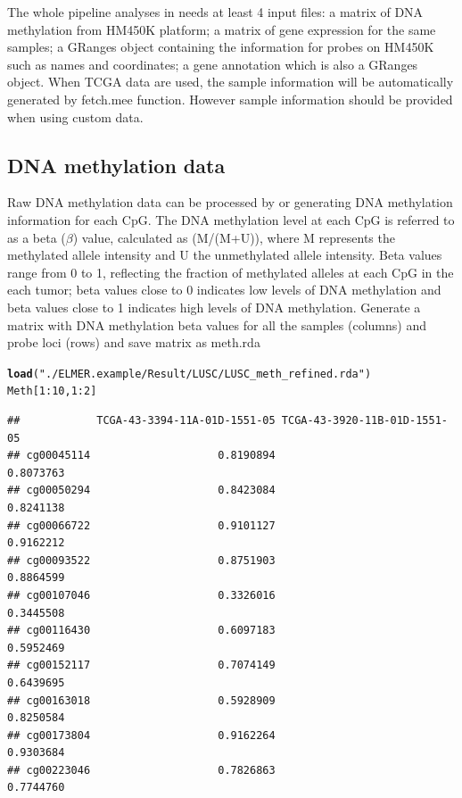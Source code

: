 \documentclass{article}\usepackage[]{graphicx}\usepackage[usenames,dvipsnames]{color}
\makeatletter
\newcommand{\hlnum}[1]{\textcolor[rgb]{0.686,0.059,0.569}{#1}}%
\newcommand{\hlstr}[1]{\textcolor[rgb]{0.192,0.494,0.8}{#1}}%
\newcommand{\hlopt}[1]{\textcolor[rgb]{0,0,0}{#1}}%
\newcommand{\hlstd}[1]{\textcolor[rgb]{0.345,0.345,0.345}{#1}}%
\newcommand{\hlkwd}[1]{\textcolor[rgb]{0.737,0.353,0.396}{\textbf{#1}}}%
\newenvironment{kframe}{%
 \def\at@end@of@kframe{}%
 \ifinner\ifhmode%
  \def\at@end@of@kframe{\end{minipage}}%
  \begin{minipage}{\columnwidth}%
 \fi\fi%
 \def\FrameCommand##1{\hskip\@totalleftmargin \hskip-\fboxsep
 \colorbox{shadecolor}{##1}\hskip-\fboxsep
     \hskip-\linewidth \hskip-\@totalleftmargin \hskip\columnwidth}%
 \MakeFramed {\advance\hsize-\width
   \@totalleftmargin\z@ \linewidth\hsize
   \@setminipage}}%
 {\par\unskip\endMakeFramed%
 \at@end@of@kframe}
\newenvironment{knitrout}{}{} %
\makeatother
\begin{document}
The whole pipeline analyses in  needs at least 4 input files:
a matrix of DNA methylation from HM450K platform; a matrix of gene expression for the 
same samples; a GRanges object containing the information for probes on HM450K such as names 
and coordinates; a gene annotation which is also a GRanges object. When TCGA data are used,
the sample information will be automatically generated by fetch.mee function. However
sample information should be provided when using custom data.

\subsection{DNA methylation data}
Raw DNA methylation data can be processed by  or 
generating DNA methylation information for each CpG. The DNA methylation level 
at each CpG is referred to as a beta ($\beta$) value, calculated as (M/(M+U)), 
where M represents the methylated allele intensity and U the unmethylated allele 
intensity. Beta values range from 0 to 1, reflecting the fraction of methylated 
alleles at each CpG in the each tumor; beta values close to 0 indicates low 
levels of DNA methylation and beta values close to 1 indicates high levels 
of DNA methylation. Generate a matrix with DNA methylation beta values for all
the samples (columns) and probe loci (rows) and save matrix as meth.rda

\begin{knitrout}
\color{fgcolor}\begin{kframe}
\begin{alltt}
\hlkwd{load}\hlstd{(}\hlstr{"./ELMER.example/Result/LUSC/LUSC_meth_refined.rda"}\hlstd{)}
\hlstd{Meth[}\hlnum{1}\hlopt{:}\hlnum{10}\hlstd{,} \hlnum{1}\hlopt{:}\hlnum{2}\hlstd{]}
\end{alltt}
\begin{verbatim}
##            TCGA-43-3394-11A-01D-1551-05 TCGA-43-3920-11B-01D-1551-05
## cg00045114                    0.8190894                    0.8073763
## cg00050294                    0.8423084                    0.8241138
## cg00066722                    0.9101127                    0.9162212
## cg00093522                    0.8751903                    0.8864599
## cg00107046                    0.3326016                    0.3445508
## cg00116430                    0.6097183                    0.5952469
## cg00152117                    0.7074149                    0.6439695
## cg00163018                    0.5928909                    0.8250584
## cg00173804                    0.9162264                    0.9303684
## cg00223046                    0.7826863                    0.7744760
\end{verbatim}
\end{kframe}
\end{knitrout}
\end{document}
